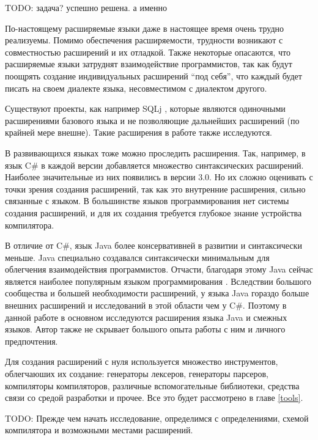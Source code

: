 \documentclass[a4paper,12pt]{article}
\begin{document}
TODO: задача? успешно решена. а именно

По-настоящему расширяемые языки даже в настоящее время очень трудно
реализуемы. Помимо обеспечения расширяемости, трудности возникают с
совместностью расширений и их отладкой. Также некоторые опасаются, что
расширяемые языки затруднят взаимодействие программистов, так как будут
поощрять создание индивидуальных расширений ``под себя'', что каждый будет
писать на своем диалекте языка, несовместимом с диалектом другого.

Существуют проекты, как например SQLj \cite{sqlj}, которые являются одиночными
расширениями базового языка и не позволяющие дальнейших расширений (по
крайней мере внешне). Такие расширения в работе также исследуются.

В развивающихся языках тоже можно проследить расширения. Так, например, в язык
C\# в каждой версии добавляется множество синтаксических расширений. Наиболее
значительные из них появились в версии 3.0. Но их сложно оценивать с точки
зрения создания расширений, так как это внутренние расширения, сильно связанные
с языком. В большинстве языков программирования нет системы создания
расширений, и для их создания требуется глубокое знание устройства компилятора.

В отличие от C\#, язык Java более консервативней в развитии и синтаксически
меньше. Java специально создавался синтаксически минимальным для облегчения
взаимодействия программистов. Отчасти, благодаря этому Java сейчас
является наиболее популярным языком программирования \cite{tiobe}. Вследствии 
большого сообщества и большей необходимости расширений, у языка Java
гораздо больше внешних расширений и исследований в этой области чем у C\#.
Поэтому в данной работе в основном исследуются расширения языка Java и смежных
языков. Автор также не скрывает большого опыта работы с ним и личного
предпочтения.

Для создания расширений с нуля используется множество инструментов, облегчаюших
их создание: генераторы лексеров, генераторы парсеров, компиляторы
компиляторов, различные вспомогательные библиотеки, средства связи со средой
разработки и прочее. Все это будет рассмотрено в главе \ref{tools}.

TODO:
Прежде чем начать исследование, определимся с определениями, схемой компилятора
и возможными местами расширений.
\end{document}
